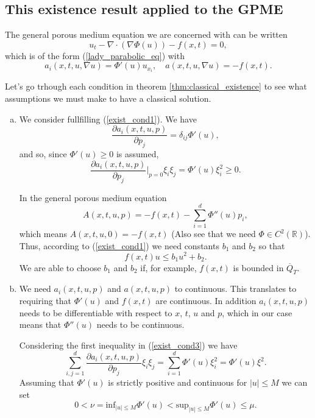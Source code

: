 \documentclass[11pt, a4paper]{article}
\begin{document}
\begin{appendices}
\subsection{This existence result applied to the GPME}
The general porous medium equation we are concerned with can be written
\begin{equation*}
u_t - \nabla \cdot (\nabla \Phi(u) ) - f(x,t) = 0,
\end{equation*}
which is of the form (\ref{lady_parabolic_eq}) with
\begin{equation}
a_i(x,t,u,\nabla u) = \Phi'(u) u_{x_i}, \quad a(x,t,u,\nabla u) = -f(x,t).
\end{equation}


Let's go trhough each condition in theorem \ref{thm:classical_existence} to see what assumptions we must make to have a classical solution.

\begin{enumerate}[a)]
	\item We consider fullfilling (\ref{exist_cond1}). We have
	\begin{equation*}
		\frac{\partial a_i(x,t,u,p)}{\partial p_j} = \delta_{ij} \Phi'(u),
	\end{equation*}
	and so, since $\Phi'(u) \geq 0$ is assumed,
	\begin{equation*}
		\frac{\partial a_i(x,t,u,p)}{\partial p_j}\Bigg|_{p=0}\xi_i\xi_j = \Phi'(u)\xi_i^2 \geq 0.
	\end{equation*}
	
	In the general porous medium equation
	\begin{equation*}
		A(x,t,u,p) = -f(x,t) - \sum_{i=1}^d \Phi''(u)p_i,
	\end{equation*}
	which means $A(x,t,u,0) = -f(x,t)$ (Also see that we need $\Phi \in C^2(\mathbb{R})$). Thus, according to (\ref{exist_cond1}) we need constants $b_1$ and $b_2$ so that
	\begin{equation*}
		f(x,t)u \leq b_1 u^2 + b_2.
	\end{equation*}
	We are able to choose $b_1$ and $b_2$ if, for example, $f(x,t)$ is bounded in $\overline{Q}_T$.
	
	\item We need $a_i(x,t,u,p)$ and $a(x,t,u,p)$ to continuous. This translates to requiring that $\Phi'(u)$ and $f(x,t)$ are continuous. In addition $a_i(x,t,u,p)$ needs to be differentiable with respect to $x$, $t$, $u$ and $p$, which in our case means that $\Phi''(u)$ needs to be continuous.
	
	Considering the first inequality in (\ref{exist_cond3}) we have
	\begin{equation*}
		\sum_{i,j=1}^d \frac{\partial a_i(x,t,u,p)}{\partial p_j} \xi_i \xi_j = \sum_{i=1}^d \Phi'(u)\xi_i^2 =\Phi'(u)\xi^2.
	\end{equation*}
	Assuming that $\Phi'(u)$ is strictly positive and continuous for $|u|\leq M$ we can set
	\begin{equation}
	0 < \nu = \text{inf}_{|u| \leq M}\Phi'(u) < \text{sup}_{|u| \leq M}\Phi'(u) \leq \mu.
	\end{equation}
	

\end{enumerate}
\end{appendices}
\end{document}
